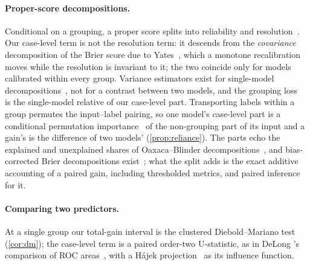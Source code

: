\paragraph{Proper-score decompositions.} Conditional on a grouping, a proper score splits into
reliability and resolution~\cite{murphy1973vector,degroot1983comparison,brocker2009reliability}.
Our case-level term is not the resolution term: it descends from the \emph{covariance}
decomposition of the Brier score due to Yates~\cite{yates1982external}, which a monotone
recalibration moves while the resolution is invariant to it; the two coincide only for models
calibrated within every group. Variance estimators exist for single-model
decompositions~\cite{siegert2014variance}, not for a contrast between two models, and the grouping
loss~\cite{perezlebel2023beyond} is the single-model relative of our case-level part. Transporting
labels within a group permutes the input--label pairing, so one model's case-level part is a
conditional permutation importance~\cite{strobl2008conditional,fisher2019all} of the non-grouping
part of its input and a gain's is the difference of two models' (\cref{prop:reliance}). The parts echo the explained and unexplained shares of
Oaxaca--Blinder decompositions~\cite{blinder1973wage}, and bias-corrected Brier
decompositions exist~\cite{ferro2012bias}; what the split adds is the exact additive accounting
of a paired gain, including thresholded metrics, and paired inference for it.

\paragraph{Comparing two predictors.} At a single group our total-gain interval is the
clustered Diebold--Mariano test~\cite{diebold1995comparing,giacomini2006tests}
(\cref{cor:dm}); the case-level term is a paired order-two U-statistic, as in DeLong
\etal's comparison of ROC areas~\cite{delong1988comparing,hoeffding1948class}, with a H\'ajek
projection~\cite{serfling1980approximation} as its influence function.
